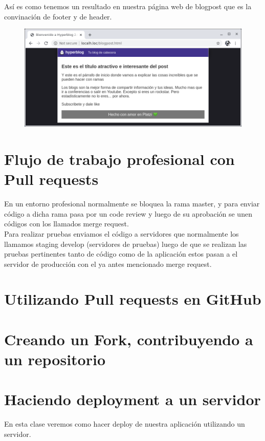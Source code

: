 \documentclass{article}
\begin{document}
Así es como tenemos un resultado en nuestra página web de blogpost que es la
convinación de footer y de header.

\newpage

\begin{figure}[h!]
  \centering
  \includegraphics[scale=0.75]{./Pictures/300_web_master.png}
\end{figure}


\newpage

\section{Flujo de trabajo profesional con Pull requests}%
En un entorno profesional normalmente se bloquea la rama master, y para enviar
código a dicha rama pasa por un code review y luego de su aprobación se unen
códigos con los llamados merge request.\\

Para realizar pruebas enviamos el código a servidores que normalmente los
llamamos staging develop (servidores de pruebas) luego de que se realizan las
pruebas pertinentes tanto de código como de la aplicación estos pasan a el
servidor de producción con el ya antes mencionado merge request.\\

\section{Utilizando Pull requests en GitHub}%

\section{Creando un Fork, contribuyendo a un repositorio}%

\section{Haciendo deployment a un servidor}%
En esta clase veremos como hacer deploy de nuestra aplicación utilizando un
servidor.\\
\end{document}
